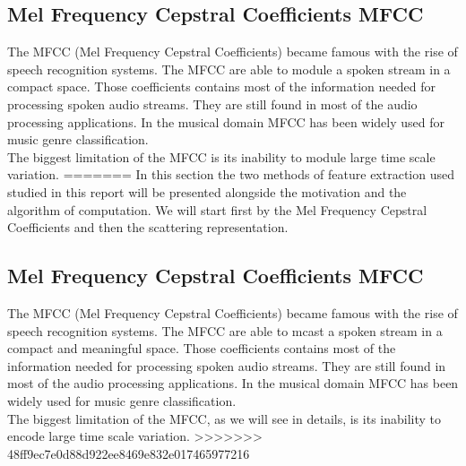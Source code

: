 \documentclass[hidelinks,12pt]{report}
\begin{document}
\subsection{Mel Frequency Cepstral Coefficients MFCC}
The MFCC (Mel Frequency Cepstral Coefficients) became famous with the rise of speech recognition systems. The MFCC are able to module a spoken stream in a compact space. Those coefficients contains most of the information needed for processing spoken audio streams. They are still found in most of the audio processing applications. In the musical domain MFCC has been widely used for music genre classification.\\ The biggest limitation of the MFCC is its inability to module large time scale variation.
=======
In this section the two methods of feature extraction used studied in this report will be presented alongside the motivation and the algorithm of computation. We will start first by the Mel Frequency Cepstral Coefficients and then the scattering representation. 
\subsection{Mel Frequency Cepstral Coefficients MFCC}
The MFCC (Mel Frequency Cepstral Coefficients)  became famous with the rise of speech recognition systems. The MFCC are able to mcast a spoken stream in a compact and meaningful space. Those coefficients contains most of the information needed for processing spoken audio streams. They are still found in most of the audio processing applications. In the musical domain MFCC has been widely used for music genre classification.\\ The biggest limitation of the MFCC, as we will see in details, is its inability to encode large time scale variation.
>>>>>>> 48ff9ec7e0d88d922ee8469e832e017465977216
\end{document}
